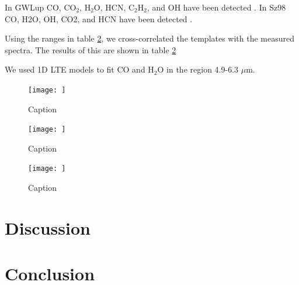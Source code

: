 \documentclass[twoside, single, authoryear, semicolon]{lion-msc}
\newcommand{\4}{$_4$}
\newcommand{\3}{$_3$}
\newcommand{\2}{$_2$}
\begin{document}
In GWLup CO, CO\2, H\2O, HCN, C\2H\2, and OH have been detected \citep{Grant_2023}. In Sz98 CO, H2O, OH, CO2, and HCN have been detected \citep{Gasman_2023}. 

Using the ranges in table \ref{}, we cross-correlated the templates with the measured spectra. The results of this are shown in table \ref{}

We used 1D LTE models to fit CO and H\2O in the region 4.9-6.3 $\mu$m.
\begin{figure}
    \centering
    \texttt{[image: ]}
    \caption{Caption}
    \label{fig:enter-label}
\end{figure}
\begin{figure}
    \centering
    \texttt{[image: ]}
    \caption{Caption}
    \label{fig:enter-label}
\end{figure}
\begin{figure}
    \centering
    \texttt{[image: ]}
    \caption{Caption}
    \label{fig:enter-label}
\end{figure}



\chapter{Discussion}


\chapter{Conclusion}



\end{document}
